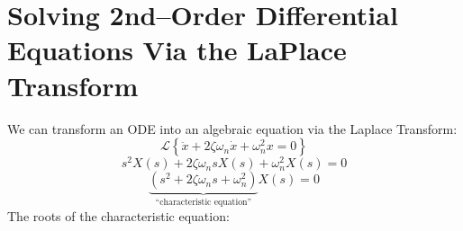 \documentclass[]{article}
\begin{document}
\section{Solving 2nd--Order Differential Equations Via the LaPlace Transform}
We can transform an ODE into an algebraic equation via the Laplace Transform:
\begin{displaymath}
 \mathcal{L}\left\{\ddot{x}+2\zeta\omega_{n}\dot{x} + \omega_{n}^{2}x=0\right\}
\end{displaymath}
\begin{displaymath}
 s^{2}X(s)+2\zeta\omega_{n}sX(s)+\omega_{n}^{2}X(s)=0
\end{displaymath}
\begin{displaymath}
 \underbrace{\left(s^{2}+2\zeta\omega_{n}s+\omega_{n}^{2}\right)}_{\text{``characteristic equation''}}X(s)=0
\end{displaymath}
The roots of the characteristic equation:
\end{document}
